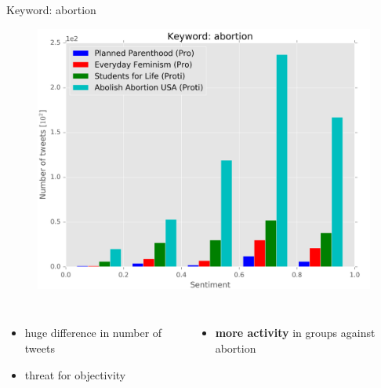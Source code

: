 \documentclass[notheorems,12pt]{beamer}
\begin{document}
\begin{frame}{Keyword: abortion}
    \begin{figure}
        \centering
        \includegraphics[scale=0.37]{./Pics/abortion.png}
    \end{figure}
    \vspace{-0.4cm}
    \begin{columns}
    \column{6cm}
    	\begin{itemize}
    		\item huge difference in number of tweets
            \item threat for objectivity
    	\end{itemize}
    \column{6cm}
    	\begin{itemize}
    		\item \textbf{more activity} in groups against abortion
        \end{itemize}
    \end{columns}
\end{frame}
\end{document}
